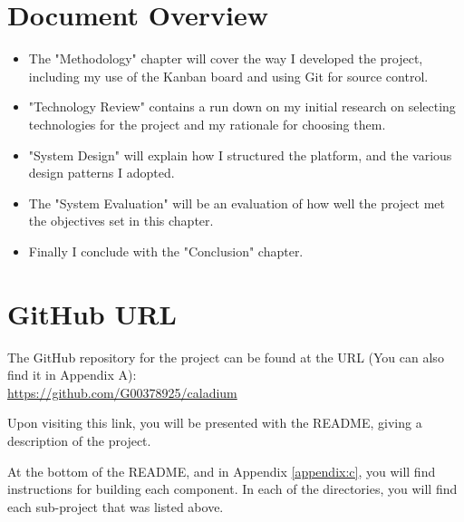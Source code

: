 
\section{Document Overview}
\begin{itemize}
  \item The "Methodology" chapter will cover the way I developed the project,
  including my use of the Kanban board and using Git for source control.
  \item "Technology Review" contains a run down on my initial research on selecting
  technologies for the project and my rationale for choosing them.
  \item "System Design" will explain how I structured the platform,
  and the various design patterns I adopted.
  \item The "System Evaluation" will be an evaluation of how well
  the project met the objectives set in this chapter.
  \item Finally I conclude with the "Conclusion" chapter.
\end{itemize}

\section{GitHub URL}
The GitHub repository for the project can be found at the URL
(You can also find it in Appendix A):\\
\href{https://github.com/G00378925/caladium}{https://github.com/G00378925/caladium}

Upon visiting this link, you will be presented with the README,
giving a description of the project.

At the bottom of the README, and in Appendix \ref{appendix:c},
you will find instructions for building each component.
In each of the directories, you will find each sub-project that was listed above.
